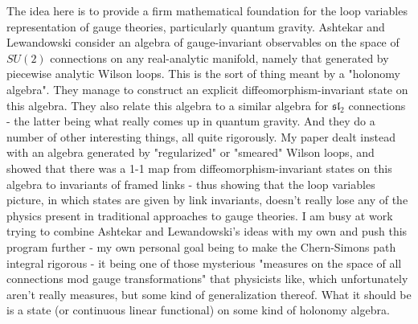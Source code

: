 The idea here is to provide a firm mathematical foundation for the loop variables representation of gauge theories, particularly quantum gravity. Ashtekar and Lewandowski consider an algebra of gauge-invariant observables on the space of $SU(2)$ connections on any real-analytic manifold, namely that generated by piecewise analytic Wilson loops. This is the sort of thing meant by a "holonomy algebra". They manage to construct an explicit diffeomorphism-invariant state on this algebra. They also relate this algebra to a similar algebra for $\mathfrak{sl}_2$ connections - the latter being what really comes up in quantum gravity. And they do a number of other interesting things, all quite rigorously. My paper dealt instead with an algebra generated by "regularized" or "smeared" Wilson loops, and showed that there was a 1-1 map from diffeomorphism-invariant states on this algebra to invariants of framed links - thus showing that the loop variables picture, in which states are given by link invariants, doesn't really lose any of the physics present in traditional approaches to gauge theories. I am busy at work trying to combine Ashtekar and Lewandowski's ideas with my own and push this program further - my own personal goal being to make the Chern-Simons path integral rigorous - it being one of those mysterious "measures on the space of all connections mod gauge transformations" that physicists like, which unfortunately aren't really measures, but some kind of generalization thereof. What it should be is a state (or continuous linear functional) on some kind of holonomy algebra. 